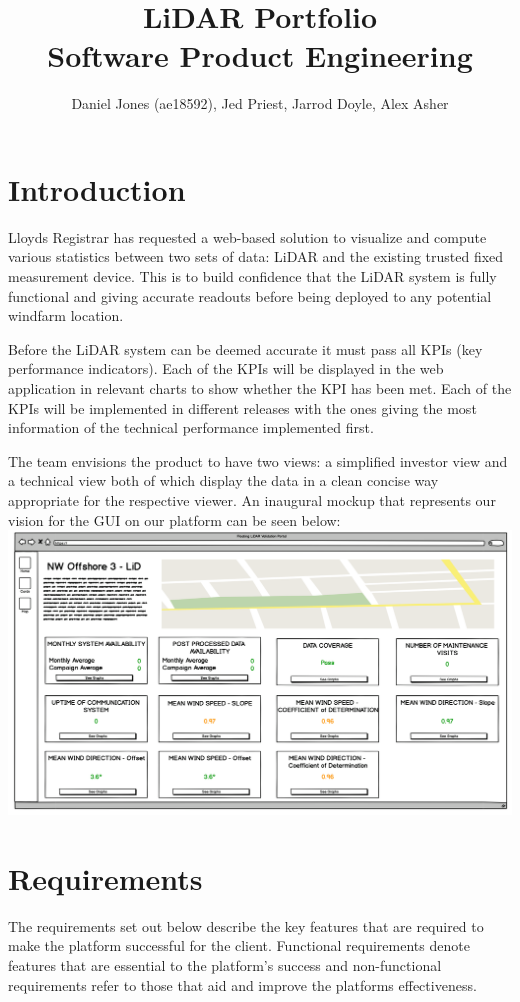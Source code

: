 \documentclass{article}
\title{LiDAR Portfolio\\\large Software Product Engineering}
\author{Daniel Jones (ae18592), Jed Priest, Jarrod Doyle, Alex Asher}
\date{}
\begin{document}
\maketitle
\begin{multicols}{2}
    \section{Introduction}
    Lloyds Registrar has requested a web-based solution to visualize and compute various statistics between two sets of data: LiDAR and the existing trusted fixed measurement device. This is to build confidence that the LiDAR system is fully functional and giving accurate readouts before being deployed to any potential windfarm location.
\par Before the LiDAR system can be deemed accurate it must pass all KPIs (key performance indicators). Each of the KPIs will be displayed in the web application in relevant charts to show whether the KPI has been met. Each of the KPIs will be implemented in different releases with the ones giving the most information of the technical performance implemented first.
\par The team envisions the product to have two views: a simplified investor view and a technical view both of which display the data in a clean concise way appropriate for the respective viewer. An inaugural mockup that represents our vision for the GUI on our platform can be seen below:
    \includegraphics[width=\linewidth]{mock1.png}
    
    \section{Requirements}
    The requirements set out below describe the key features that are required to make the platform successful for the client. Functional requirements denote features that are essential to the platform's success and non-functional requirements refer to those that aid and improve the platforms effectiveness.

\end{multicols}
\end{document}
